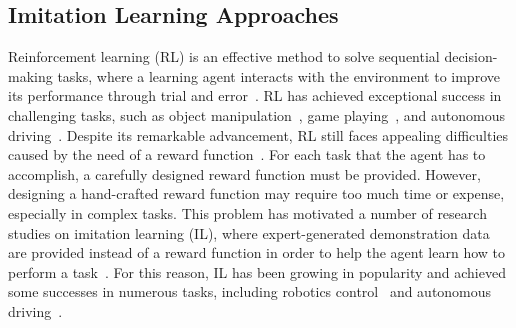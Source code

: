 \subsection{Imitation Learning Approaches}

Reinforcement learning (RL) is an effective method to solve sequential decision-making tasks,
where a learning agent interacts with the environment to improve its performance through trial and error~\cite{RL_AnIntroductionBook}.
RL has achieved exceptional success in challenging tasks, such as object manipulation~\cite{RL_Object_1, RL_Object_2, RL_Object_3, RL_Object_4},
game playing~\cite{RL_Game_1, RL_Game_2, RL_Game_3, RL_Game_4},
and autonomous driving~\cite{RL_Driving_1, RL_Driving_2, RL_Driving_3, RL_Driving_4}.
Despite its remarkable advancement,
RL still faces appealing difficulties caused by the need of a reward function~\cite{RL_Challenges_1, RL_Challenges_2}.
For each task that the agent has to accomplish,
a carefully designed reward function must be provided.
However,
designing a hand-crafted reward function may require too much time or expense, especially in complex tasks.
This problem has motivated a number of research studies on imitation learning (IL),
where expert-generated demonstration data are provided instead of a reward function in order to help the agent learn how to perform a task~\cite{IL_Survey_1, IL_Survey_2}.
For this reason, IL has been growing in popularity and achieved some successes in numerous tasks, including robotics control~\cite{IL_Robotics_1, IL_Robotics_2, IL_Robotics_3} and autonomous driving~\cite{IL_Driving_1, IL_Driving_2, IL_Driving_3, IL_Driving_4}.

